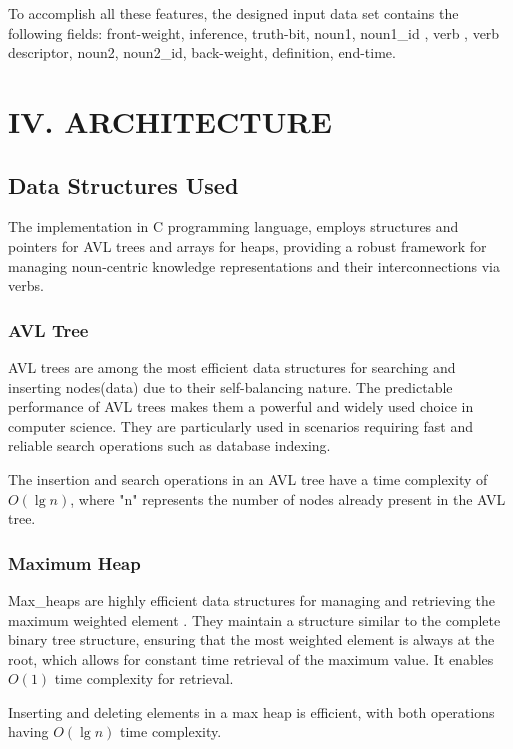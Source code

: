 \documentclass[conference]{IEEEtran}
\begin{document}
To accomplish all these features, the designed input data set contains the following fields: front-weight, inference, truth-bit, noun1, noun1\_id , verb , verb descriptor, noun2, noun2\_id, back-weight, definition, end-time.


\section{IV. ARCHITECTURE}

\subsection{Data Structures Used}
The implementation in C programming language\cite{b9}, employs structures and pointers for AVL trees and arrays for heaps, providing a robust framework for managing noun-centric knowledge representations and their interconnections via verbs.

\subsubsection{AVL Tree}

AVL trees\cite{b14} are among the most efficient data structures for searching and inserting nodes(data) due to their 
self-balancing nature. The predictable performance of AVL trees makes 
them a powerful and widely used choice in computer 
science.
They are particularly used in scenarios requiring fast and reliable search operations such as database indexing.

The insertion and search operations in an AVL tree have a time complexity of $O(\lg n)$, 
where "n" represents the number of nodes already present in the AVL tree.


\subsubsection{Maximum Heap}

Max\_heaps\cite{b14} are highly efficient data structures for managing and retrieving the maximum weighted element . 
They maintain a structure similar to the complete binary tree structure, ensuring that the most weighted 
element is always at the root, which allows for constant time retrieval of the maximum value.
It enables $O(1)$ time complexity for retrieval.

Inserting and deleting elements in a max heap is efficient, with both operations having $O(\lg n)$ 
   time complexity.
\end{document}

